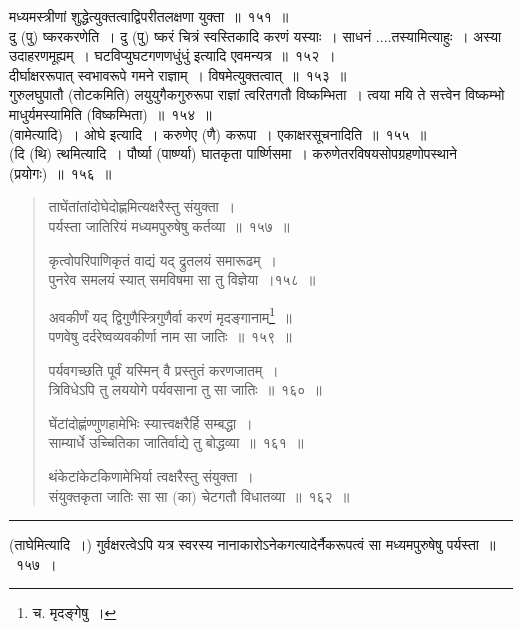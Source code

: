 \documentclass[11pt, openany]{book}
\begin{document}
\vspace{2mm}
मध्यमस्त्रीणां शुद्धेत्युक्तत्वाद्विपरीतलक्षणा युक्ता~॥~१५१~॥\\

दु (पु) ष्करकरणेति~। दु (पु) ष्करं चित्रं स्वस्तिकादि करणं यस्याः~। साधनं ....तस्यामित्याहुः~। अस्या उदाहरणमूह्यम्~। घटविप्युघटगणणधुंधुं इत्यादि एवमन्यत्र~॥~१५२~।\\

दीर्घाक्षररूपात् स्वभावरूपे गमने राज्ञाम्~। {\qtt विषमेत्युक्तत्वात्}~॥~१५३~॥\\

गुरुलघुपातौ (तोटकमिति) लयुयुगैकगुरुरूपा राज्ञां त्वरितगतौ विष्कम्भिता~। त्वया मयि ते सत्त्वेन विष्कम्भो माधुर्यमस्यामिति (विष्कम्भिता)~॥~१५४~॥\\

({\qtt वामेत्यादि})~। ओघे इत्यादि~। करुणेए (णै) करूपा~। {\qtt एकाक्षरसूचनादिति}~॥~१५५~॥\\

(दि (थि) त्थमित्यादि~। पौर्ष्या (पार्ष्ण्या) घातकृता पार्ष्णिसमा~। {\qtt करुणेतरविषयसोपग्रहणोपस्थाने}  (प्रयोगः)~॥~१५६~॥

\newpage

\begin{quote}
{\na ताघेंतांतांदोघेदोह्णमित्यक्षरैस्तु संयुक्ता~।\\
पर्यस्ता जातिरियं मध्यमपुरुषेषु कर्तव्या~॥~१५७~॥

कृत्वोपरिपाणिकृतं वाद्यं यद् द्रुतलयं समारूढम्~।\\
पुनरेव समलयं स्यात् समविषमा सा तु विज्ञेया~।१५८~॥

अवकीर्णं यद् द्विगुणैस्त्रिगुणैर्वा करणं मृदङ्गानाम्\renewcommand{\thefootnote}{1}\footnote{च. मृदङ्गेषु~।}~॥\\
पणवेषु दर्दरेष्वव्यवकीर्णा नाम सा जातिः~॥~१५९~॥

पर्यवगच्छति पूर्वं यस्मिन् वै प्रस्तुतं करणजातम्~।\\
त्रिविधेऽपि तु लययोगे पर्यवसाना तु सा जातिः~॥~१६०~॥

घेंटांदोह्णंण्णुणहामेभिः स्यात्त्वक्षरैर्हि सम्बद्धा~।\\
साम्यार्धे उच्चितिका जातिर्वाद्ये तु बोद्धव्या~॥~१६१~॥

थंकेटांकेटकिणामेभिर्या त्वक्षरैस्तु संयुक्ता~।\\
संयुक्तकृता जातिः सा सा (का) चेटगतौ विधातव्या~॥~१६२~॥}
\end{quote}

\hrule

\vspace{2mm}
(ताघेमित्यादि~।) गुर्वक्षरत्वेऽपि यत्र स्वरस्य नानाकारोऽनेकगत्यादेर्नैकरूपत्वं सा मध्यमपुरुषेषु पर्यस्ता~॥~१५७~।\\
\end{document}
